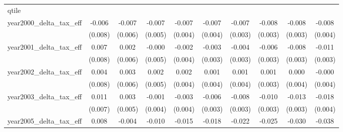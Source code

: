 {\begin{tabular}{l*{9}{c}}
\hline
qtile       &                     &                     &                     &                     &                     &                     &                     &                     &                     \\
year2000_delta_tax_eff&      -0.006         &      -0.007         &      -0.007         &      -0.007\sym{*}  &      -0.007\sym{**} &      -0.007\sym{**} &      -0.008\sym{**} &      -0.008\sym{**} &      -0.008\sym{**} \\
            &     (0.008)         &     (0.006)         &     (0.005)         &     (0.004)         &     (0.004)         &     (0.003)         &     (0.003)         &     (0.003)         &     (0.004)         \\
[1em]
year2001_delta_tax_eff&       0.007         &       0.002         &      -0.000         &      -0.002         &      -0.003         &      -0.004         &      -0.006\sym{**} &      -0.008\sym{***}&      -0.011\sym{***}\\
            &     (0.008)         &     (0.006)         &     (0.005)         &     (0.004)         &     (0.003)         &     (0.003)         &     (0.003)         &     (0.003)         &     (0.003)         \\
[1em]
year2002_delta_tax_eff&       0.004         &       0.003         &       0.002         &       0.002         &       0.001         &       0.001         &       0.001         &       0.000         &      -0.000         \\
            &     (0.008)         &     (0.006)         &     (0.005)         &     (0.004)         &     (0.004)         &     (0.004)         &     (0.003)         &     (0.004)         &     (0.004)         \\
[1em]
year2003_delta_tax_eff&       0.011         &       0.003         &      -0.001         &      -0.003         &      -0.006\sym{*}  &      -0.008\sym{**} &      -0.010\sym{***}&      -0.013\sym{***}&      -0.018\sym{***}\\
            &     (0.007)         &     (0.005)         &     (0.004)         &     (0.004)         &     (0.003)         &     (0.003)         &     (0.003)         &     (0.003)         &     (0.004)         \\
[1em]
year2005_delta_tax_eff&       0.008         &      -0.004         &      -0.010\sym{**} &      -0.015\sym{***}&      -0.018\sym{***}&      -0.022\sym{***}&      -0.025\sym{***}&      -0.030\sym{***}&      -0.038\sym{***}\\

\end{tabular}}
